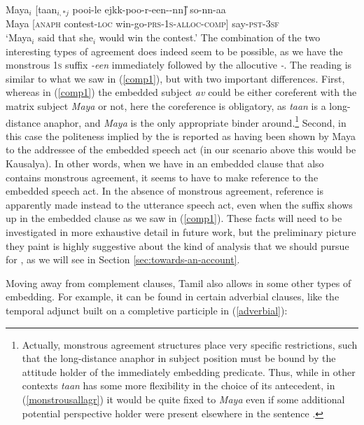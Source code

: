 \documentclass[output=paper, modfonts, nonflat]{langsci/langscibook}
\begin{document}
\ea\label{monstrousallagr}\gll Maya$_i$ [taan$_{i,*j}$ poo\textrtailt\textrtailt i-le \J
ejkk\A-poo-r-een-\nga-nn\U] so-nn-aa\\  
Maya [\textsc{anaph} contest-\textsc{loc}{}
win-go-\textsc{prs}-1\textsc{s}-\textsc{alloc}-\textsc{comp}] say-\textsc{pst}-3\textsc{sf}\\ 
\glt `Maya$_i$ said that she$_i$ would win the contest.'
\z
%
The combination of the two interesting types of agreement does indeed
seem to be possible, as we have the monstrous \textsc{1s} suffix
\textit{-een} immediately followed by the allocutive
\textit{-\nga}. The reading is similar to what we saw in
(\ref{comp1}), but with two important differences. First, whereas in
(\ref{comp1}) the embedded subject \textit{av\A} could be either
coreferent with the matrix subject \textit{Maya} or not, here the
coreference is obligatory, as \textit{taan} is a long-distance
anaphor, and \textit{Maya} is the only appropriate binder
around.\footnote{Actually, monstrous agreement structures place very
  specific restrictions, such that the long-distance anaphor in
  subject position must be bound by the attitude holder of the
  immediately embedding predicate. Thus, while in other contexts
  \textit{taan} has some more flexibility in the choice of its
  antecedent, in (\ref{monstrousallagr}) it would be quite fixed to
  \textit{Maya} even if some additional potential perspective holder
  were present elsewhere in the sentence \citep[see][for
  details]{sundaresan:diss}.} Second, in this case the politeness
implied by the \allagr{} is reported as having been shown by Maya to
the addressee of the embedded speech act (in our scenario above this
would be Kausalya). In other words, when we have \allagr{} in an
embedded clause that also contains monstrous agreement, it seems to
have to make reference to the embedded speech act. In the absence of
monstrous agreement, reference is apparently made instead to the
utterance speech act, even when the suffix shows up in the embedded
clause as we saw in (\ref{comp1}). These facts will need to be
investigated in more exhaustive detail in future work, but the
preliminary picture they paint is highly suggestive about the kind of
analysis that we should pursue for \allagr, as we will see in Section
\ref{sec:towards-an-account}.

Moving away from complement clauses, Tamil also allows \allagr{} in
some other types of embedding. For example, it can be found in certain
adverbial clauses, like the temporal adjunct built on a completive
participle in (\ref{adverbial}):
\end{document}
